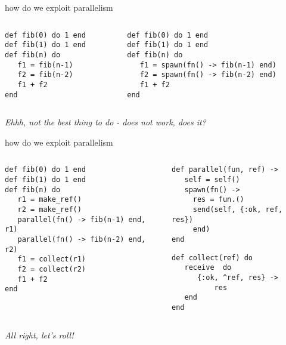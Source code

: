\begin{frame}[fragile]{how do we exploit parallelism}

\begin{columns}
 \begin{column}{0.5\linewidth}
\begin{verbatim}
def fib(0) do 1 end
def fib(1) do 1 end
def fib(n) do
   f1 = fib(n-1)
   f2 = fib(n-2)
   f1 + f2
end
\end{verbatim}
 \end{column}
\pause
 \begin{column}{0.5\linewidth}
\begin{verbatim}
def fib(0) do 1 end
def fib(1) do 1 end
def fib(n) do
   f1 = spawn(fn() -> fib(n-1) end)
   f2 = spawn(fn() -> fib(n-2) end)
   f1 + f2
end
\end{verbatim}
 \end{column}
\end{columns}

\pause\vspace{20pt}
{\em Ehhh, not the best thing to do - does not work, does it?}

\end{frame}


\begin{frame}[fragile]{how do we exploit parallelism}

\begin{columns}
 \begin{column}{0.5\linewidth}
 \begin{verbatim}
def fib(0) do 1 end
def fib(1) do 1 end
def fib(n) do
   r1 = make_ref()
   r2 = make_ref()
   parallel(fn() -> fib(n-1) end, r1)
   parallel(fn() -> fib(n-2) end, r2)
   f1 = collect(r1)
   f2 = collect(r2)
   f1 + f2
end
\end{verbatim}
 \end{column}
\pause
 \begin{column}{0.5\linewidth}
\begin{verbatim}
def parallel(fun, ref) ->
   self = self()
   spawn(fn() -> 
     res = fun.()
     send(self, {:ok, ref, res})
     end)
end 
\end{verbatim}
\begin{verbatim}
def collect(ref) do
   receive  do
      {:ok, ^ref, res} ->
          res
   end
end
\end{verbatim}
 \end{column}
\end{columns}

\pause\vspace{20pt}
{\em All right, let's roll!}

\end{frame}

